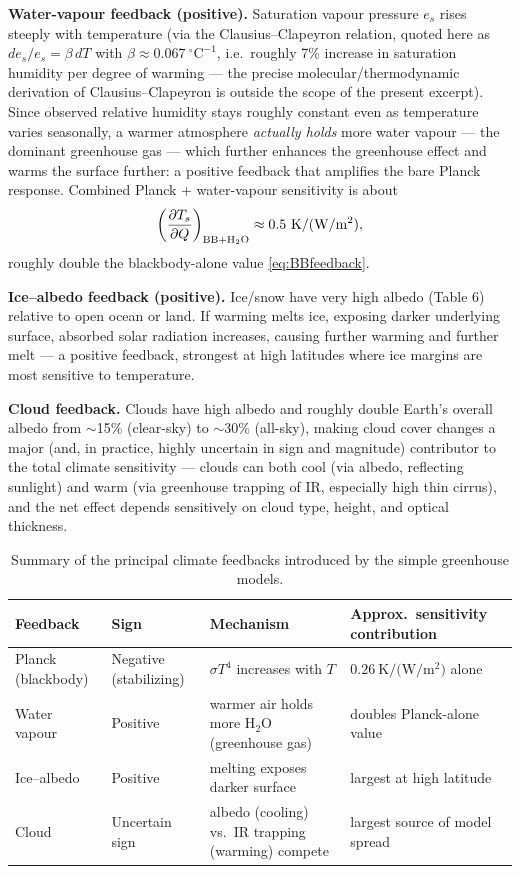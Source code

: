 \documentclass[11pt]{article}
\begin{document}
\textbf{Water-vapour feedback (positive).} Saturation vapour pressure $e_s$ rises steeply with temperature (via the Clausius--Clapeyron relation, quoted here as $de_s/e_s = \beta\,dT$ with $\beta\approx0.067\ ^\circ\text{C}^{-1}$, i.e.\ roughly 7\% increase in saturation humidity per degree of warming — the precise molecular/thermodynamic derivation of Clausius--Clapeyron is outside the scope of the present excerpt). Since observed relative humidity stays roughly constant even as temperature varies seasonally, a warmer atmosphere \emph{actually holds} more water vapour — the dominant greenhouse gas — which further enhances the greenhouse effect and warms the surface further: a positive feedback that amplifies the bare Planck response. Combined Planck + water-vapour sensitivity is about
\begin{equation}
\left(\frac{\partial T_s}{\partial Q}\right)_{\rm BB+H_2O} \approx 0.5\ \si{\kelvin\per(\watt\per\square\m)},
\end{equation}
roughly double the blackbody-alone value \eqref{eq:BBfeedback}.

\textbf{Ice--albedo feedback (positive).} Ice/snow have very high albedo (Table 6) relative to open ocean or land. If warming melts ice, exposing darker underlying surface, absorbed solar radiation increases, causing further warming and further melt — a positive feedback, strongest at high latitudes where ice margins are most sensitive to temperature.

\textbf{Cloud feedback.} Clouds have high albedo and roughly double Earth's overall albedo from $\sim$15\% (clear-sky) to $\sim$30\% (all-sky), making cloud cover changes a major (and, in practice, highly uncertain in sign and magnitude) contributor to the total climate sensitivity — clouds can both cool (via albedo, reflecting sunlight) and warm (via greenhouse trapping of IR, especially high thin cirrus), and the net effect depends sensitively on cloud type, height, and optical thickness.

\begin{table}[h!]
\centering
\small
\begin{tabular}{@{}p{2.4cm}p{2.1cm}p{5.3cm}p{4cm}@{}}
\toprule
Feedback & Sign & Mechanism & Approx.\ sensitivity contribution \\
\midrule
Planck (blackbody) & Negative (stabilizing) & $\sigma T^4$ increases with $T$ & $0.26\ \si{\kelvin\per(\watt\per\square\m)}$ alone \\
Water vapour & Positive & warmer air holds more H$_2$O (greenhouse gas) & doubles Planck-alone value \\
Ice--albedo & Positive & melting exposes darker surface & largest at high latitude \\
Cloud & Uncertain sign & albedo (cooling) vs.\ IR trapping (warming) compete & largest source of model spread \\
\bottomrule
\end{tabular}
\caption{Summary of the principal climate feedbacks introduced by the simple greenhouse models.}
\end{table}
\end{document}

